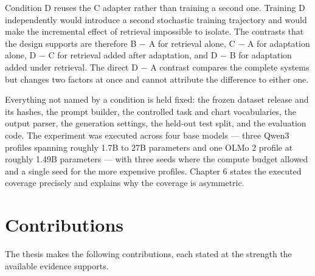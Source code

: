Condition D reuses the C adapter rather than training a second one. Training D independently would introduce a second stochastic training trajectory and would make the incremental effect of retrieval impossible to isolate. The contrasts that the design supports are therefore B \ensuremath{-} A for retrieval alone, C \ensuremath{-} A for adaptation alone, D \ensuremath{-} C for retrieval added after adaptation, and D \ensuremath{-} B for adaptation added under retrieval. The direct D \ensuremath{-} A contrast compares the complete systems but changes two factors at once and cannot attribute the difference to either one.

Everything not named by a condition is held fixed: the frozen dataset release and its hashes, the prompt builder, the controlled task and chart vocabularies, the output parser, the generation settings, the held-out test split, and the evaluation code. The experiment was executed across four base models --- three Qwen3 profiles spanning roughly 1.7B to 27B parameters and one OLMo 2 profile at roughly 1.49B parameters \cite{yang2025qwen3,olmo2025furious} --- with three seeds where the compute budget allowed and a single seed for the more expensive profiles. Chapter 6 states the executed coverage precisely and explains why the coverage is asymmetric.

\section{Contributions}

The thesis makes the following contributions, each stated at the strength the available evidence supports.

